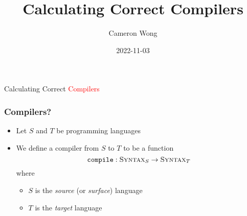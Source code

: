 \documentclass[usenames,dvipsnames]{beamer}
\title[]{Calculating Correct Compilers} %
\author{Cameron Wong} %
\institute[CS-252R]{CS-252R}
\date{2022-11-03} %
\newcommand{\compile}{\texttt{compile}}
\newcommand{\syn}{\textsc{Syntax}}
\begin{document}
\begin{frame}
\titlepage %
\end{frame}




\begin{frame}
  \frametitle{}

  \begin{center}
    \Huge Calculating Correct \textcolor{red}{Compilers}
  \end{center}
\end{frame}


\begin{frame}
  \frametitle{Compilers?}

  \begin{itemize}
    \item Let $S$ and $T$ be programming languages
    \item We define a compiler from $S$ to $T$ to be a function
      \begin{equation}
        \compile : \syn_{S} \rightarrow \syn_{T}
      \end{equation}
      where
      \begin{itemize}
        \item $S$ is the \emph{source} (or \emph{surface}) language
        \item $T$ is the \emph{target} language
      \end{itemize}
  \end{itemize}
\end{frame}
\end{document}
